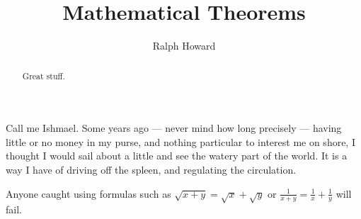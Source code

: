 \documentclass{amsart}
\theoremstyle{definition}
\theoremstyle{remark}
\numberwithin{equation}{section}
\begin{document}

\title{Mathematical Theorems}


\author{Ralph Howard}
\address{Department of Mathematics, University of South Carolina,
	Columbia, SC 29208}





\begin{abstract}
	Great stuff.
\end{abstract}







Call me Ishmael. Some years ago --- never mind how long precisely ---
having little or no money in my purse, and nothing particular to
interest me on shore, I thought I would sail about a little and see
the watery part of the world. It is a way I have of driving off the
spleen, and regulating the circulation.



Anyone caught using formulas such as $\sqrt{x+y}=\sqrt{x}+\sqrt{y}$
or $\frac{1}{x+y}=\frac{1}{x}+\frac{1}{y}$ will fail.
\end{document}
